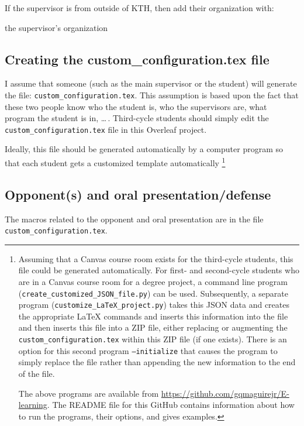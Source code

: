 \documentclass[12pt, twoside]{article}
\newcommand{\fname}[1]{\texttt{#1}}
\begin{document}
If the supervisor is from outside of \gls{KTH}, then add their organization with:
\begin{description}[leftmargin=!, labelwidth =\widthof{\texttt{\textbackslash secondAuthorsFirstname\{\}}}]
\item [\texttt{\textbackslash supervisorXsOrganization\{\}}] the supervisor's organization
\end{description}

\subsection{Creating the custom\_configuration.tex file}
\label{sec:customisedConfigFile}
I assume that someone (such as the main supervisor or the student) will generate the file: \fname{custom\_configuration.tex}. This assumption is based upon the fact that these two people know who the student is, who the supervisors are, what program the student is in, \ldots\,. Third-cycle students should simply edit the \fname{custom\_configuration.tex} file in this Overleaf project.

Ideally, this file should be generated automatically by a computer program so that each student gets a customized template automatically \footnote{Assuming that a Canvas course room exists for the third-cycle students, this file could be generated automatically. For first- and second-cycle students who are in a Canvas course room for a degree project, a command line program (\texttt{create\_customized\_JSON\_file.py}) can be used. 
Subsequently, a separate program (\texttt{customize\_LaTeX\_project.py}) takes this \gls{JSON} data and creates the appropriate \LaTeX{} commands and inserts this information into the file and then inserts this file into a ZIP file, either replacing or augmenting the \fname{custom\_configuration.tex} within this ZIP file (if one exists). There is an option for this second program \texttt{--initialize} that causes the program to simply replace the file rather than appending the new information to the end of the file.

The above programs are available from \url{https://github.com/gqmaguirejr/E-learning}. The README file for this GitHub contains information about how to run the programs, their options, and gives examples.}

\subsection{Opponent(s) and oral presentation/defense}
\label{sec:opponentMacros}
The macros related to the opponent and oral presentation are in the file \linebreak[4] \fname{custom\_configuration.tex}.
\end{document}
